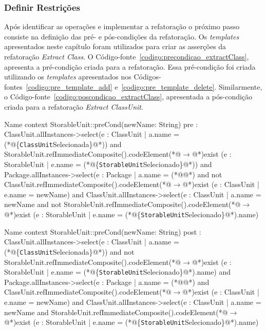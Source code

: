 \subsubsection{Definir Restrições}

Após identificar as operações e implementar a refatoração o próximo passo consiste na definição das pré- e pós-condições da refatoração. Os \textit{templates} apresentados neste capítulo foram utilizados para criar as asserções da refatoração \textit{Extract Class}. O Código-fonte~\ref{codigo:precondicao_extractClass}, apresenta a pré-condição criada para a refatoração. Essa pré-condição foi criada utilizando os \textit{templates} apresentados nos Códigos-fontes~\ref{codigo:pre_template_add} e~\ref{codigo:pre_template_delete}. Similarmente, o Código-fonte~\ref{codigo:poscondicao_extractClass}, apresentada a pós-condição criada para a refatoração \textit{Extract ClassUnit}.

\begin{codigo}[caption={[Pré-condição da refatoração \textit{Extract Class}.] Pré-condição da refatoração \textit{Extract Class}.},escapeinside={(*@}{@*)}, basicstyle=\footnotesize, label={codigo:precondicao_extractClass}, language=OCL]{Name}
context StorableUnit::preCond(newName: String)
pre : ClassUnit.allInstances->select(e : ClassUnit | a.name = (*@\{\texttt{ClassUnit}Selecionada\}@*)) and StorableUnit.refImmediateComposite().codeElement(*@$\rightarrow$@*)exist (e : StorableUnit | e.name = (*@\{\texttt{StorableUnit}Selecionado\}@*))
and Package.allInstances->select(e : Package | a.name = (*@@*) and not ClassUnit.refImmediateComposite().codeElement(*@$\rightarrow$@*)exist (e : ClassUnit | e.name = newName) 
and ClassUnit.allInstances->select(e : ClassUnit | a.name = newName and not StorableUnit.refImmediateComposite().codeElement(*@$\rightarrow$@*)exist (e : StorableUnit | e.name = (*@\{\texttt{StorableUnit}Selecionado\}@*).name) 
\end{codigo}

\begin{codigo}[caption={[Pós-condição da refatoração \textit{Extract ClassUnit}.] Pós-condição da refatoração \textit{Extract ClassUnit}.},escapeinside={(*@}{@*)}, basicstyle=\footnotesize, label={codigo:poscondicao_extractClass}, language=OCL]{Name}
context StorableUnit::preCond(newName: String)
post : ClassUnit.allInstances->select(e : ClassUnit | a.name = (*@\{\texttt{ClassUnit}Selecionada\}@*)) and not StorableUnit.refImmediateComposite().codeElement(*@$\rightarrow$@*)exist (e : StorableUnit | e.name = (*@\{\texttt{StorableUnit}Selecionado\}@*).name)
and Package.allInstances->select(e : Package | a.name = (*@@*) and ClassUnit.refImmediateComposite().codeElement(*@$\rightarrow$@*)exist (e : ClassUnit | e.name = newName) 
and ClassUnit.allInstances->select(e : ClassUnit | a.name = newName and StorableUnit.refImmediateComposite().codeElement(*@$\rightarrow$@*)exist (e : StorableUnit | e.name = (*@\{\texttt{StorableUnit}Selecionado\}@*).name) 
\end{codigo}

